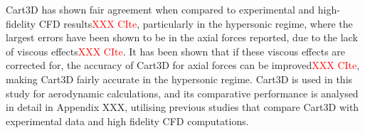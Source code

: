 Cart3D has shown fair agreement when compared to experimental and high-fidelity CFD results\textcolor{red}{XXX CIte}, particularly in the hypersonic regime, where the largest errors have been shown to be in the axial forces reported, due to the lack of viscous effects\textcolor{red}{XXX CIte}. 
It has been shown that if these viscous effects are corrected for, the accuracy of Cart3D for axial forces can be improved\textcolor{red}{XXX CIte}, making Cart3D fairly accurate in the hypersonic regime. Cart3D is used in this study for aerodynamic calculations, and its comparative performance is analysed in detail in Appendix XXX, utilising previous studies that compare Cart3D with experimental data and high fidelity CFD computations. 




      
